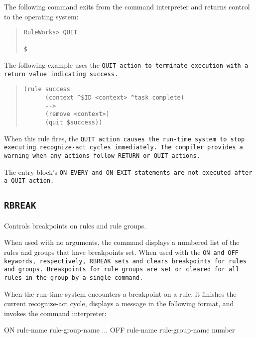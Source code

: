 {{\Example

The following command exits from the command interpreter and
returns control to the operating system:

\begin{quote}
\begin{verbatim}
RuleWorks> QUIT

$
\end{verbatim}
\end{quote}

The following example uses the \tt{QUIT} action to terminate
execution with a return value indicating success.
\begin{quote}
\begin{verbatim}
(rule success
      (context ^$ID <context> ^task complete)
      -->
      (remove <context>)
      (quit $success))
\end{verbatim}
\end{quote}

When this rule fires, the \tt{QUIT} action causes the run-time
system to stop executing recognize-act cycles immediately.
The compiler provides a warning when any actions follow
\tt{RETURN} or \tt{QUIT} actions.

The entry block's \tt{ON-EVERY} and \tt{ON-EXIT} statements are not
executed after a \tt{QUIT} action.

\subsection{\tt{RBREAK}}

Controls breakpoints on rules and rule groups.

When used with no arguments, the command displays a numbered list of
the rules and groups that have breakpoints set. When used with the
\tt{ON} and \tt{OFF} keywords, respectively, \tt{RBREAK} sets and
clears breakpoints for rules and groups. Breakpoints for rule groups
are set or cleared for all rules in the group by a single command.

When the run-time system encounters a breakpoint on a rule, it
finishes the current recognize-act cycle, displays a message in the
following format, and invokes the command interpreter:


\Format

ON
{
rule-name
rule-group-name
}...
OFF
{
rule-name
rule-group-name
number
}

}}
